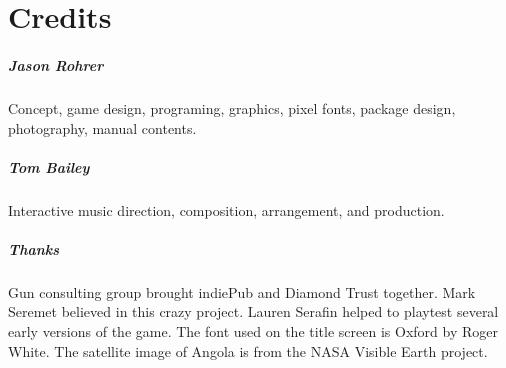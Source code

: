 \documentclass[8pt]{extbook}
\begin{document}



\part{Credits}
\addtocounter{chapter}{1}
\setcounter{section}{0}

\subsubsection{Jason Rohrer}
Concept, game design, programing, graphics, pixel fonts, package design, photography, manual contents.

\subsubsection{Tom Bailey}
Interactive music direction, composition, arrangement, and production.

\subsubsection{Thanks}
Gun consulting group brought indiePub and Diamond Trust together.  Mark Seremet believed in this crazy project.  Lauren Serafin helped to playtest several early versions of the game.  The font used on the title screen is Oxford by Roger White.  The satellite image of Angola is from the NASA Visible Earth project.
\end{document}
